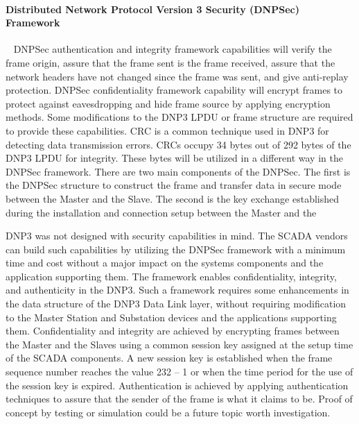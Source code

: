 \documentclass[twosided,a4,10pt]{article}
\begin{document}
\begin{multicols}{2}
 \paragraph{Distributed Network Protocol Version 3 Security (DNPSec) Framework} ~ \newline
 DNPSec authentication and integrity framework capabilities will verify the frame origin, assure that the frame sent is the frame received, assure that the network headers have not changed since the frame was sent, and give anti-replay protection. DNPSec confidentiality framework capability will encrypt frames to protect against eavesdropping and hide frame source by applying encryption methods. Some modifications to the DNP3 LPDU or frame structure are required to provide these capabilities.\newline
 CRC is a common technique used in DNP3 for detecting data transmission errors. CRCs occupy 34 bytes out of 292 bytes of the DNP3 LPDU for integrity. These bytes will be utilized in a different way in the DNPSec framework. There are two main components of the DNPSec. The first is the DNPSec structure to construct the frame and transfer data in secure mode between the Master and the Slave. The second is the key exchange established during the installation and connection setup between the Master and the
 
 DNP3 was not designed with security capabilities in mind. The SCADA vendors can build such capabilities by utilizing the DNPSec framework with a minimum time and cost without a major impact on the systems components and the application supporting them.
 \newline
 The framework enables confidentiality, integrity, and authenticity in the DNP3. Such a framework requires some enhancements in the data structure of the DNP3 Data Link layer, without requiring modification to the Master Station and Substation devices and the applications supporting them. Confidentiality and integrity are achieved by encrypting frames between the Master and the Slaves using a common session key assigned at the setup time of the SCADA components. A new session key is established when the frame sequence number reaches the value 232 – 1 or when the time period for the use of the session key is expired. Authentication is achieved by applying authentication techniques to assure that the sender of the frame is what it claims to be. Proof of concept by testing or simulation could be a future topic worth investigation.
 

\end{multicols}
\end{document}
